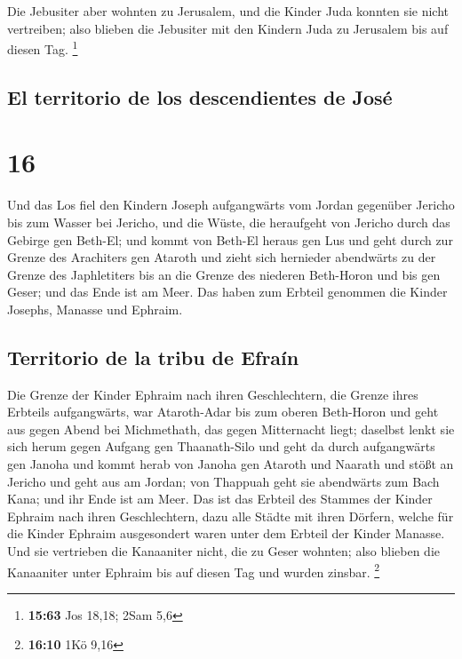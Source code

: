  Die Jebusiter aber wohnten zu Jerusalem, und die Kinder
Juda konnten sie nicht vertreiben; also blieben die Jebusiter mit den
Kindern Juda zu Jerusalem bis auf diesen Tag. \footnote{\textbf{15:63}
  Jos 18,18; 2Sam 5,6}

\hypertarget{el-territorio-de-los-descendientes-de-josuxe9}{%
\subsection{El territorio de los descendientes de
José}\label{el-territorio-de-los-descendientes-de-josuxe9}}

\hypertarget{section-15}{%
\section{16}\label{section-15}}

 Und das Los fiel den Kindern Joseph aufgangwärts vom
Jordan gegenüber Jericho bis zum Wasser bei Jericho, und die Wüste, die
heraufgeht von Jericho durch das Gebirge gen Beth-El;  und
kommt von Beth-El heraus gen Lus und geht durch zur Grenze des
Arachiters gen Ataroth  und zieht sich hernieder
abendwärts zu der Grenze des Japhletiters bis an die Grenze des niederen
Beth-Horon und bis gen Geser; und das Ende ist am Meer. 
Das haben zum Erbteil genommen die Kinder Josephs, Manasse und Ephraim.

\hypertarget{territorio-de-la-tribu-de-efrauxedn}{%
\subsection{Territorio de la tribu de
Efraín}\label{territorio-de-la-tribu-de-efrauxedn}}

 Die Grenze der Kinder Ephraim nach ihren Geschlechtern,
die Grenze ihres Erbteils aufgangwärts, war Ataroth-Adar bis zum oberen
Beth-Horon  und geht aus gegen Abend bei Michmethath, das
gegen Mitternacht liegt; daselbst lenkt sie sich herum gegen Aufgang gen
Thaanath-Silo und geht da durch aufgangwärts gen Janoha 
und kommt herab von Janoha gen Ataroth und Naarath und stößt an Jericho
und geht aus am Jordan;  von Thappuah geht sie abendwärts
zum Bach Kana; und ihr Ende ist am Meer. Das ist das Erbteil des Stammes
der Kinder Ephraim nach ihren Geschlechtern,  dazu alle
Städte mit ihren Dörfern, welche für die Kinder Ephraim ausgesondert
waren unter dem Erbteil der Kinder Manasse.  Und sie
vertrieben die Kanaaniter nicht, die zu Geser wohnten; also blieben die
Kanaaniter unter Ephraim bis auf diesen Tag und wurden zinsbar.
\footnote{\textbf{16:10} 1Kö 9,16}

